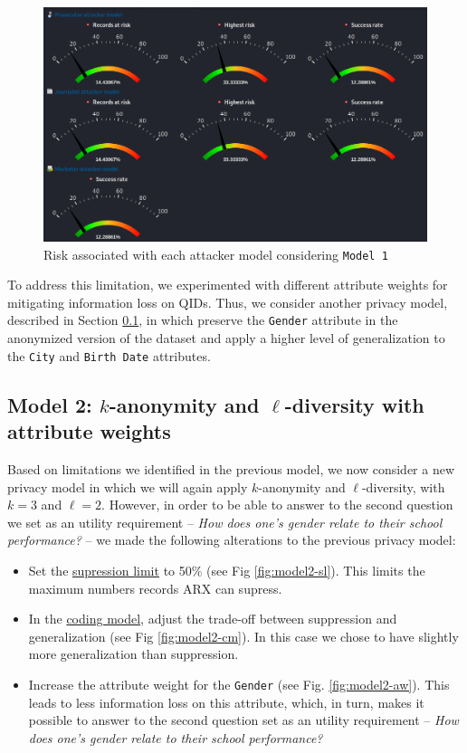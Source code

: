 \documentclass[a4paper, 11pt]{article}
\begin{document}
\begin{figure}[H]
	\centering
	\includegraphics[width=.9\textwidth]{img/risk-model1.png}
	\caption{Risk associated with each attacker model considering \texttt{Model 1}}
	\label{fig:risk-model1}
\end{figure} 

To address this limitation, we experimented with different attribute weights 
for mitigating information loss on QIDs. Thus, we consider another privacy 
model, described in Section {\ref{sec:model2}}, in which preserve the 
\texttt{Gender} attribute in the anonymized version of the dataset and apply a 
higher level of generalization to the \texttt{City} and \texttt{Birth Date} 
attributes.

\pagebreak

\subsection{Model 2: $k$-anonymity and $\ell$-diversity with attribute weights} 
\label{sec:model2}

Based on limitations we identified in the previous model, we now consider a new 
privacy model in which we will again apply $k$-anonymity and $\ell$-diversity, 
with $k = 3$ and $\ell = 2$. However, in order to be able to answer to the 
second question we set as an utility requirement -- \textit{How does one's 
gender relate to their school performance?} -- we made the following 
alterations to the previous privacy model:

\begin{itemize}
    \item Set the \uline{supression limit} to 50\% (see Fig \ref{fig:model2-sl}).
    This limits the maximum numbers records ARX can supress.
    \item In the \uline{coding model}, adjust the trade-off between suppression 
    and generalization (see Fig \ref{fig:model2-cm}). In this case we chose to have 
    slightly more generalization than suppression.
    \item Increase the attribute weight for the \texttt{Gender} (see Fig. \ref{fig:model2-aw}).
    This leads to less information loss on this attribute, which, in turn, makes
    it possible to answer to the second question set as an utility requirement -- \textit{How
    does one's gender relate to their school performance?}
\end{itemize}
\end{document}
